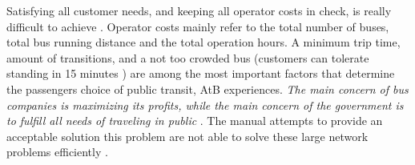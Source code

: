  Satisfying all customer needs, and keeping all operator costs in check, is really difficult to achieve \citep{kechagiopoulos13}. Operator costs mainly refer to the total number of buses, total bus running distance and the total operation hours. A minimum trip time, amount of transitions, and a not too crowded bus (customers can tolerate standing in 15 minutes ) are among the most important factors that determine the passengers choice of public transit, AtB experiences.  
 \textit{The main concern of bus companies is maximizing its profits, while the main concern of the government is to fulfill all needs of traveling in public} \citep{kechagiopoulos13}. The manual attempts to provide an acceptable solution this problem are not able to solve these large network problems efficiently \citep{kechagiopoulos13}. 




















